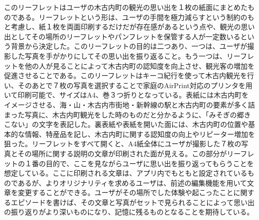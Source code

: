 このリーフレットはユーザの木古内町の観光の思い出を１枚の紙面にまとめたものである。リーフレットという形は、ユーザの手間を極力減らすという制約のもと考慮し、紙１枚を両面印刷するだけだが存在感があるという点や、観光の思い出としてその場所のリーフレットやパンフレットを保管する人が一定数いるという背景から決定した。このリーフレットの目的は二つあり、一つは、ユーザが撮影した写真を手がかりにしてその思い出を振り返ること。もう一つは、リーフレットを他の人が見ることによって木古内町の認知度を向上させ、観光客の増加を促進させることである。このリーフレットはキーコ紀行を使って木古内観光を行い、そのあとで７枚の写真を選択することで家庭のAirPrint対応のプリンタを用いて印刷可能で、サイズはA4、巻３つ折りとなっている。表紙には木古内町をイメージさせる、海・山・木古内市街地・新幹線の駅と木古内町の要素が多く詰まった写真に、木古内町観光をした時のものだと分かるように、「みそぎの郷きこない」の文字を表記した。裏表紙や表紙を開いた面には、木古内町の位置や基本的な情報、特産品を記し、木古内町に関する認知度の向上やリピーター増加を狙った。リーフレットをすべて開くと、A4紙全体にユーザが撮影した７枚の写真とその場所に関する説明の文章が印刷された面が見える。この部分がリーフレットの１番の目的で、ここを見ながらユーザに思い出を振り返ってもらうことを想定している。ここに印刷される文章は、アプリ内でもともと設定されているものであるが、よりオリジナリティを求めるユーザは、前述の編集機能を用いて文章を変更することができる。ユーザがその場所でした体験や起こったことに関するエピソードを書けば、その文章と写真がセットで見られることによって思い出の振り返りがより深いものになり、記憶に残るものとなることを期待している。
